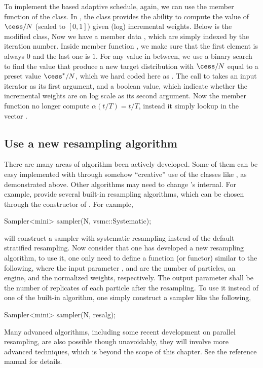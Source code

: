 To implement the \cess based adaptive schedule, again, we can use the member
function  of the  class. In
\vsmc, the  class provides the ability to compute the
value of $\cess/N$ (scaled to $[0,1]$) given (log) incremental weights. Below
is the modified  class,
Now we have a member data , which are simply indexed by the
iteration number. Inside member function , we make
sure that the first element is always $0$ and the last one is $1$. For any
value in between, we use a binary search to find the value that produce a new
target distribution with $\cess/N$ equal to a preset value $\cess^*/N$, which
we hard coded here as . The call to
 takes an input iterator as its first argument, and
a boolean value, which indicate whether the incremental weights are on log
scale as its second argument. Now the  member function no
longer compute $\alpha(t/T) = t/T$, instead it simply lookup in the vector
.

\subsection{Use a new resampling algorithm}
\label{sub:Use a new resampling algorithm}

There are many areas of \vsmc algorithm been actively developed. Some of them
can be easy implemented with \vsmc through somehow ``creative'' use of the
classes like , as demonstrated above. Other algorithms
may need to change \vsmc's internal. For example, \vsmc provide several
built-in resampling algorithms, which can be chosen through the constructor of
. For example,
\begin{cppcode}
Sampler<mini> sampler(N, vsmc::Systematic);
\end{cppcode}
will construct a sampler with systematic resampling instead of the default
stratified resampling. Now consider that one has developed a new resampling
algorithm, to use it, one only need to define a function (or functor) similar
to the following,
where the input parameter ,  and
 are the number of particles, an \cppoo{} \rng engine, and
the normalized weights, respectively. The output parameter
 shall be the number of replicates of each particle
after the resampling. To use it instead of one of the built-in algorithm, one
simply construct a sampler like the following,
\begin{cppcode}
Sampler<mini> sampler(N, resalg);
\end{cppcode}
Many advanced algorithms, including some recent development on parallel
resampling, are also possible though unavoidably, they will involve more
advanced \cpp techniques, which is beyond the scope of this chapter. See the
reference manual for details.

